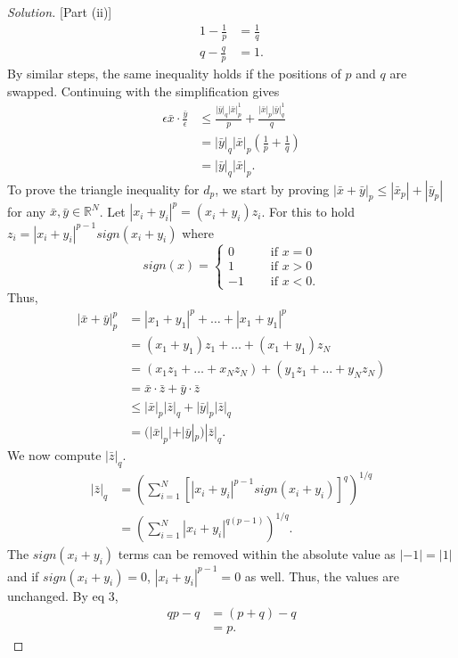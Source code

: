 \documentclass[11pt,letterpaper]{article}
\newcommand{\R}{\mathbb{R}}
\newenvironment{solution}
  {\renewcommand\qedsymbol{}\begin{proof}[Solution]}
  {\end{proof}\bigskip}
\begin{document}
\begin{solution}[Part (ii)]
\[\begin{split}
		1-\frac{1}{p} &= \frac{1}{q}\\
		q-\frac{q}{p} &= 1.
	\end{split}
	\]
	By similar steps, the same inequality holds if the positions of $p$ and $q$ are swapped. Continuing with the simplification gives
	\[\begin{split}
		\epsilon \bar x \cdot \frac{\bar y}{\epsilon} &\leq \frac{|\bar y|_q|\bar x|_p^{1}}{p} + \frac{|\bar x|_p|\bar y|_q^{1}}{q}\\
		&= |\bar y|_q|\bar x|_p \left ( \frac{1}{p} + \frac{1}{q} \right )\\
		&= |\bar y|_q|\bar x|_p.
	\end{split}
	\]
	To prove the triangle inequality for $d_p$, we start by proving $|\bar x + \bar y|_p \leq |\bar x_p| + |\bar y_p|$ for any $\bar x, \bar y \in \R^N$. Let $|x_i + y_i|^p = (x_i+y_i)z_i$. For this to hold $z_i = |x_i+y_i|^{p-1}sign(x_i+y_i)$ where \[sign(x) = 
	\begin{cases}
		0 \quad &\text{ if } x =0\\
		1 \quad &\text{ if } x>0\\
		-1 \quad &\text { if } x<0.
	\end{cases}\]
	Thus, 
	\[\begin{split}
		|\bar x + \bar y|_p^p &= |x_1 + y_1|^p + \dotsc + |x_1 + y_1|^p\\
		&=(x_1 + y_1)z_1 + \dotsc + (x_1 + y_1)z_N\\
		&= (x_1z_1 + \dotsc + x_Nz_N) + (y_1z_1+ \dotsc + y_Nz_N)\\
		&= \bar x \cdot \bar z + \bar y \cdot \bar z\\
		&\leq |\bar x|_p|\bar z|_q + |\bar y|_p|\bar z|_q\\
		&= (|\bar x|_p| + |\bar y|_p)|\bar z|_q.
	\end{split}\]
	We now compute $|\bar z|_q$.
	\[
	\begin{split}
		|\bar z|_q &= \left ( \sum_{i=1}^{N} \left [|x_i+y_i|^{p-1}sign(x_i+y_i) \right ] ^q \right ) ^{1/q}\\
		&= \left ( \sum_{i=1}^{N} |x_i+y_i|^{q(p-1)} \right ) ^{1/q}.
	\end{split}\]
	The $sign(x_i+y_i)$ terms can be removed within the absolute value as $|-1| = |1|$ and if $sign(x_i+y_i) = 0$, $|x_i+y_i|^{p-1} = 0$ as well. Thus, the values are unchanged. By eq 3, 
	\[\begin{split}
		qp-q &= (p+q) - q\\
		&= p.
	\end{split}\]

\end{solution}
\end{document}

